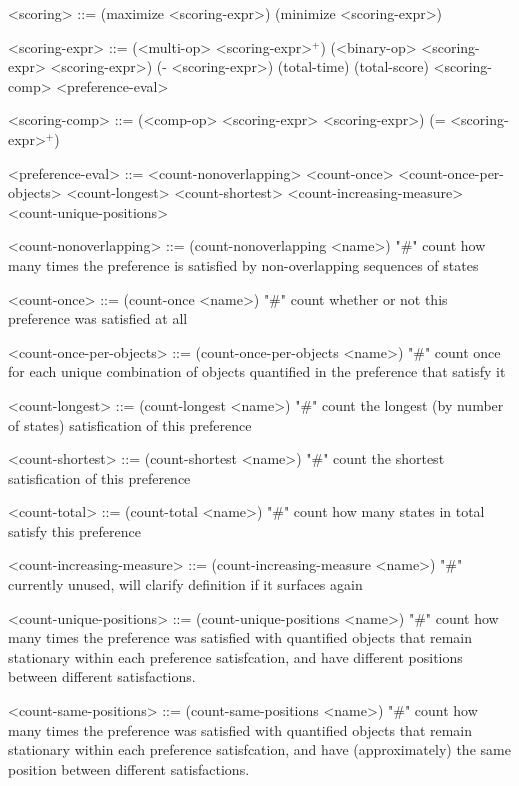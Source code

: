 \documentclass{article}
\begin{document}
\begin{grammar}
<scoring> ::= (maximize <scoring-expr>) \alt (minimize <scoring-expr>)

<scoring-expr> ::= (<multi-op> <scoring-expr>$^+$) \alt
        (<binary-op> <scoring-expr> <scoring-expr>) \alt
        (- <scoring-expr>) \alt
        (total-time) \alt
        (total-score) \alt
        <scoring-comp> \alt
        <preference-eval> 
        
    

<scoring-comp> ::=  (<comp-op> <scoring-expr> <scoring-expr>) \alt
        (= <scoring-expr>$^+$)
    

<preference-eval> ::=  <count-nonoverlapping> \alt
        <count-once> \alt
        <count-once-per-objects> \alt
        <count-longest> \alt
        <count-shortest> \alt
        <count-increasing-measure> \alt
        <count-unique-positions>
    

<count-nonoverlapping> ::= (count-nonoverlapping <name>) "#" count how many times the preference is satisfied by non-overlapping sequences of states 

<count-once> ::= (count-once <name>) "#" count whether or not this preference was satisfied at all

<count-once-per-objects> ::= (count-once-per-objects <name>) "#" count once for each unique combination of objects quantified in the preference that satisfy it

{ \color{gray} <count-longest> ::= (count-longest <name>) "#" count the longest (by number of states) satisfication of this preference }

{ \color{gray} <count-shortest> ::= (count-shortest <name>) "#" count the shortest satisfication of this preference  }

{ \color{gray} <count-total> ::= (count-total <name>) "#" count how many states in total satisfy this preference }

{ \color{gray} <count-increasing-measure> ::= (count-increasing-measure <name>) "#" currently unused, will clarify definition if it surfaces again }

<count-unique-positions> ::= (count-unique-positions <name>) "#" count how many times the preference was satisfied with quantified objects that remain stationary within each preference satisfcation, and have different positions between different satisfactions.

{ \color{teal} <count-same-positions> ::= (count-same-positions <name>) "#" count how many times the preference was satisfied with quantified objects that remain stationary within each preference satisfcation, and have (approximately) the same position between different satisfactions. }


\end{grammar}
\end{document}
